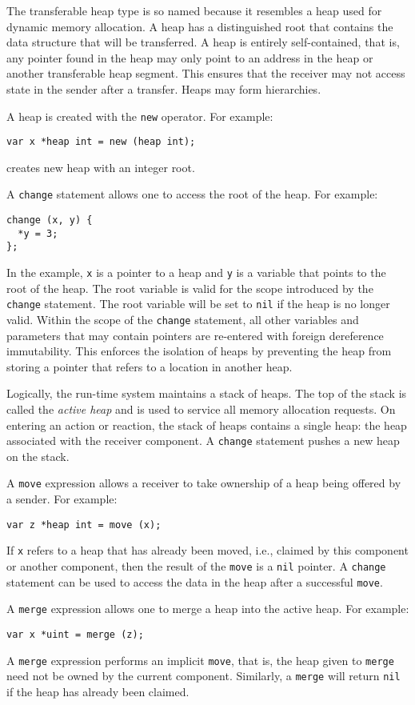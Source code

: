 The transferable heap type is so named because it resembles a heap used for dynamic memory allocation.
A heap has a distinguished root that contains the data structure that will be transferred.
A heap is entirely self-contained, that is, any pointer found in the heap may only point to an address in the heap or another transferable heap segment.
This ensures that the receiver may not access state in the sender after a transfer.
Heaps may form hierarchies.

A heap is created with the \verb+new+ operator.
For example:
\begin{verbatim}
var x *heap int = new (heap int);
\end{verbatim}
creates new heap with an integer root.

A \verb+change+ statement allows one to access the root of the heap.
For example:
\begin{verbatim}
change (x, y) {
  *y = 3;
};
\end{verbatim}
In the example, \verb+x+ is a pointer to a heap and \verb+y+ is a variable that points to the root of the heap.
The root variable is valid for the scope introduced by the \verb+change+ statement.
The root variable will be set to \verb+nil+ if the heap is no longer valid.
Within the scope of the \verb+change+ statement, all other variables and parameters that may contain pointers are re-entered with foreign dereference immutability.
This enforces the isolation of heaps by preventing the heap from storing a pointer that refers to a location in another heap.

Logically, the run-time system maintains a stack of heaps.
The top of the stack is called the \emph{active heap} and is used to service all memory allocation requests.
On entering an action or reaction, the stack of heaps contains a single heap:  the heap associated with the receiver component.
A \verb+change+ statement pushes a new heap on the stack.

A \verb+move+ expression allows a receiver to take ownership of a heap being offered by a sender.
For example:
\begin{verbatim}
var z *heap int = move (x);
\end{verbatim}
If \verb+x+ refers to a heap that has already been moved, i.e., claimed by this component or another component, then the result of the \verb+move+ is a \verb+nil+ pointer.
A \verb+change+ statement can be used to access the data in the heap after a successful \verb+move+.

A \verb+merge+ expression allows one to merge a heap into the active heap.
For example:
\begin{verbatim}
var x *uint = merge (z);
\end{verbatim}
A \verb+merge+ expression performs an implicit \verb+move+, that is, the heap given to \verb+merge+ need not be owned by the current component.
Similarly, a \verb+merge+ will return \verb+nil+ if the heap has already been claimed.

